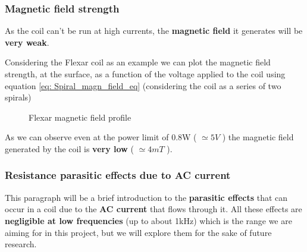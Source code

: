 \begin{samepage}
    \subsubsection{Magnetic field strength}
    As the coil can't be run at high currents, the \textbf{magnetic field} it generates will be \textbf{very weak}.
    \nopagebreak

    Considering the Flexar coil as an example we can plot the magnetic field strength, at the surface, as a function of the voltage applied to the coil using equation \ref{eq: Spiral_magn_field_eq} (considering the coil as a series of two spirals)
    \nopagebreak

    \begin{figure}[H]
        \centering
        \resizebox{0.5\textwidth}{!}{
            
        }
        \caption{Flexar magnetic field profile}
        \label{fig: Flexar_magnetic_field}
    \end{figure}
    \nopagebreak

    As we can observe even at the power limit of 0.8W ( $\simeq 5V$ ) the magnetic field generated by the coil is \textbf{very low} ( $\simeq 4mT$ ).
\end{samepage}

\subsubsection{Resistance parasitic effects due to AC current}
This paragraph will be a brief introduction to the \textbf{parasitic effects} that can occur in a coil due to the \textbf{AC current} that flows through it. All these effects are \textbf{negligible at low frequencies} (up to about 1kHz) which is the range we are aiming for in this project, but we will explore them for the sake of future research.

